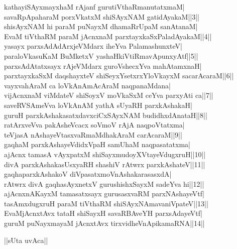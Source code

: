 \documentclass{article}
\begin{document}
kathayiSAyxmayxhaM rAjanf gurutiVthaRmanutatxmaM|\\
savaRpApaharaM porxVkatxM shiSAyxNAM gatidAyakaM||3||\\
shisAyxNAM hi paraM puNayxM dhamaRrUpaM sanAtanaM|\\
EvaM tiVthaRM paraM jAcnxnaM parxtayxkaSxPaladAyakaM||4||\\
yasayx parxsAdAdArxjeVMdarx iheYva PalamashunxteV|\\
paraloVkasuKaM BuMketxV yashaHkiVtiRmavApunxyAtf||5||\\
parxsAdAtatxsayx rAjeVMdarx guroVshecxYva mahAtamxnaH|\\
parxtayxkaSxM daqshayxteV shiSeyxYsetxrxYloVkayxM sacarAcaraM||6||\\
vayxvahAraM ca loVkAnAmAcAraM naqpanaMdana|\\
vijAcnxnaM viMdateV shiSoyxV moVkaSxM ceYva parxyAti ca||7||\\
saveRVSAmeVva loVkAnAM yathA sUyaRH parxkAshakaH|\\
guruH parxkAshakasatxdavxciCxSAyxNAM budidhxdAnataH||8||\\
ratArxveVva pakAsheVcacx soVmoV rAjA naqpoVtatxma|\\
teVjasA nAshayeVtasxvaRmaMdhakAraM carAcaraM||9||\\
gaqhaM parxkAshayeVdidxVpaH samUhaM naqpasatatxma|\\
ajAcnx tamasA vAyxpatxM shiSayxmudoyXVtayeVdugxruH||10||\\
divA parxkAshakasUsxyaRH shashiV rAtwrx parxkAshateV||11||\\
gaqhaparxkAshakoV diVpasatxmoVnAshakarasasxdA|\\
rAtwrx divA gaqhasAyxnetxV gurushishxSayxM sadeYva hi||12||\\
ajAcnxnAKayxM tamasatxsayx gurusasxvaRM parxNAshayeVtf|\\
tasAmxdugxruH paraM tiVthaRM shiSAyxNAmavaniVpateV||13||\\
EvaMjAcnxtAvx tataH shiSayxH savaRBAveYH parxsAdayeVtf|\\
guruM puNayxmayaM jAcnxtAvx tirxvidheVnApikamaRNA||14||\\

\begin{center}
||sUta uvAca||
\end{center}
\end{document}
